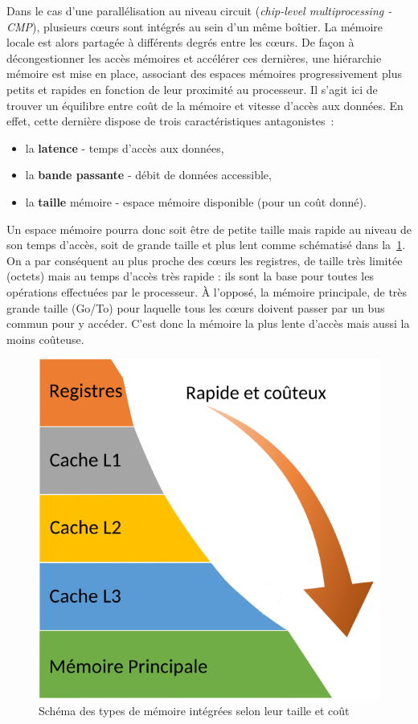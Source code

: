 Dans le cas d'une parallélisation au niveau circuit (\emph{chip-level multiprocessing - CMP}), plusieurs c\oe{}urs sont intégrés au sein d'un même boîtier. La mémoire locale est alors partagée à différents degrés entre les c\oe{}urs. De façon à décongestionner les accès mémoires et accélérer ces dernières, une hiérarchie mémoire est mise en place, associant des espaces mémoires progressivement plus petits et rapides en fonction de leur proximité au processeur. Il s'agit ici de trouver un équilibre entre coût de la mémoire et vitesse d'accès aux données. En effet,  cette dernière dispose de trois caractéristiques antagonistes : 
\begin{itemize}
	\item la \textbf{latence} - temps d'accès aux données, 
	\item la \textbf{bande passante} - débit de données accessible,
	\item la \textbf{taille} mémoire - espace mémoire disponible (pour un coût donné).
\end{itemize}
Un espace mémoire pourra donc soit être de petite taille mais rapide au niveau de son temps d'accès, soit de grande taille et plus lent comme schématisé dans la~\ref{fig:hierarchiememoire}. On a par conséquent au plus proche des c\oe{}urs les registres, de taille très limitée (octets) mais au temps d'accès très rapide : ils sont la base pour toutes les opérations effectuées par le processeur. À l'opposé, la mémoire principale, de très grande taille (Go/To) pour laquelle tous les c\oe{}urs doivent passer par un bus commun pour y accéder. C'est donc la mémoire la plus lente d'accès mais aussi la moins coûteuse.
\begin{figure}
	\centering
	\includegraphics[width=0.5\linewidth]{schemas/hierarchieMemoire}
	\caption[hiérarchie mémoire multic\oe{}ur]{Schéma des types de mémoire intégrées selon leur taille et coût}
	\label{fig:hierarchiememoire}
\end{figure}


